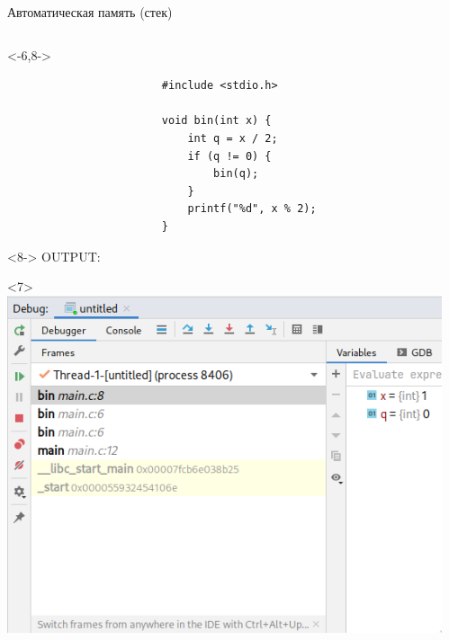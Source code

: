\documentclass[aspectratio=169,14pt]{beamer}
\begin{document}
    \begin{frame}[fragile]{Автоматическая память (стек)}
        \begin{columns}
            \begin{column}{0.5\textwidth}
                \begin{onlyenv}<-6,8->
                    \begin{verbatim}
                        #include <stdio.h>

                        void bin(int x) {
                            int q = x / 2;
                            if (q != 0) {
                                bin(q);
                            }
                            printf("%d", x % 2);
                        }
                    \end{verbatim}
                \end{onlyenv}
                \begin{onlyenv}<8->
                    \vspace*{0.5\baselineskip}
                    \vspace*{0.5\baselineskip}
                    {\color{gray}OUTPUT:} \only<9->{1}  
                \end{onlyenv}
                \begin{onlyenv}<7>
                    \includegraphics[width=\textwidth]{media/dbg-stack}
                \end{onlyenv}
            \end{column}
            \begin{column}{0.5\textwidth}

\end{column}
\end{columns}
\end{frame}
\end{document}

